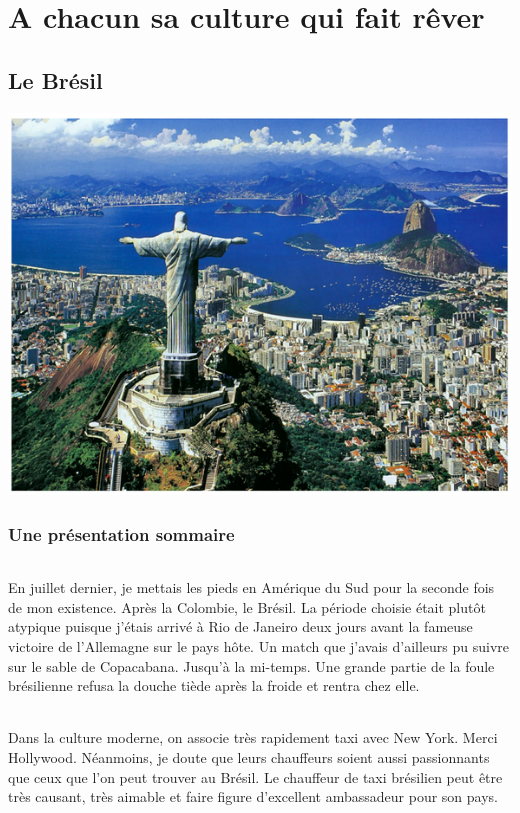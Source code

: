 \part{A chacun sa culture qui fait rêver}
\chapter{Le Brésil}

\begin{center}
\includegraphics[scale=0.5]{bresil1.png}
\end{center}

\section{Une présentation sommaire}

\paragraph{} En juillet dernier, je mettais les pieds en Amérique du Sud pour
la seconde fois de mon existence. Après la Colombie, le Brésil. La période
choisie était plutôt atypique puisque j’étais arrivé à Rio de Janeiro deux
jours avant la fameuse victoire de l’Allemagne sur le pays hôte. Un match que
j’avais d’ailleurs pu suivre sur le sable de Copacabana. Jusqu’à la mi-temps.
Une grande partie de la foule brésilienne refusa la douche tiède après la
froide et rentra chez elle.

\paragraph{} Dans la culture moderne, on associe très rapidement taxi avec New
York. Merci Hollywood. Néanmoins, je doute que leurs chauffeurs soient aussi
passionnants que ceux que l’on peut trouver au Brésil.  Le chauffeur de taxi
brésilien peut être très causant, très aimable et faire figure d’excellent
ambassadeur pour son pays.

